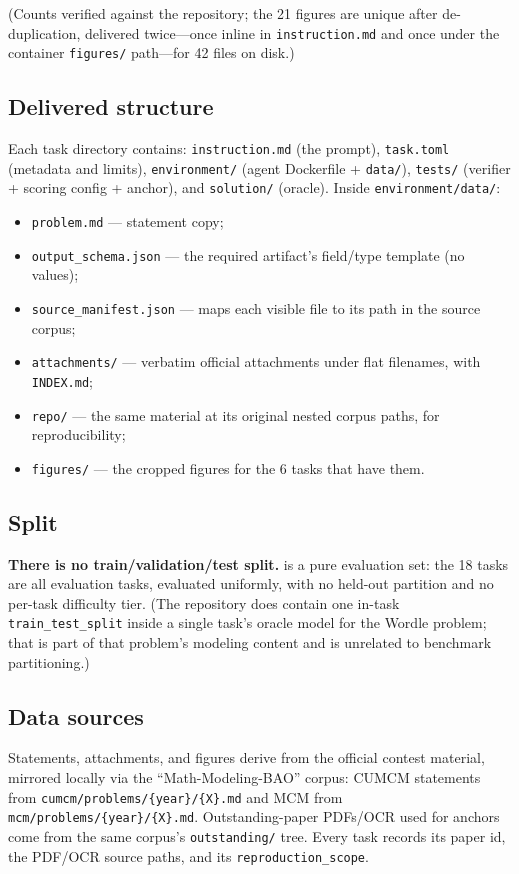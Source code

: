 (Counts verified against the repository; the 21 figures are unique after de-duplication, delivered twice---once inline in \texttt{instruction.md} and once under the container \texttt{figures/} path---for 42 files on disk.)

\subsection{Delivered structure}
Each task directory contains: \texttt{instruction.md} (the prompt), \texttt{task.toml} (metadata and limits), \texttt{environment/} (agent Dockerfile + \texttt{data/}), \texttt{tests/} (verifier + scoring config + anchor), and \texttt{solution/} (oracle). Inside \texttt{environment/data/}:
\begin{itemize}[leftmargin=1.4em,itemsep=1pt]
\item \texttt{problem.md} --- statement copy;
\item \texttt{output\_schema.json} --- the required artifact's field/type template (no values);
\item \texttt{source\_manifest.json} --- maps each visible file to its path in the source corpus;
\item \texttt{attachments/} --- verbatim official attachments under flat filenames, with \texttt{INDEX.md};
\item \texttt{repo/} --- the same material at its original nested corpus paths, for reproducibility;
\item \texttt{figures/} --- the cropped figures for the 6 tasks that have them.
\end{itemize}

\subsection{Split}
\textbf{There is no train/validation/test split.} \bench{} is a pure evaluation set: the 18 tasks are all evaluation tasks, evaluated uniformly, with no held-out partition and no per-task difficulty tier. (The repository does contain one in-task \texttt{train\_test\_split} inside a single task's oracle model for the Wordle problem; that is part of that problem's modeling content and is unrelated to benchmark partitioning.)

\subsection{Data sources}
Statements, attachments, and figures derive from the official contest material, mirrored locally via the ``Math-Modeling-BAO'' corpus: CUMCM statements from \texttt{cumcm/problems/\{year\}/\{X\}.md} and MCM from \texttt{mcm/problems/\{year\}/\{X\}.md}. Outstanding-paper PDFs/OCR used for anchors come from the same corpus's \texttt{outstanding/} tree. Every task records its paper id, the PDF/OCR source paths, and its \texttt{reproduction\_scope}.
